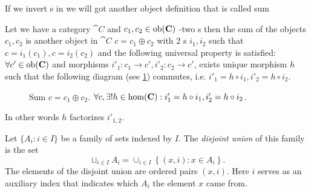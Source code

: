 If we invert s in  we will
got another 
object definition that is called sum

\begin{definition}[Sum]
\label{def:sum}
Let we have a category $\cat{C}$ and $c_1, c_2 \in \mathrm{ob}(\mathbf{C})$ -two
s then the sum of the objects $c_1, c_2$ is
another object in $\cat{C}$ $c = c_1 \oplus c_2$ with 2
s $i_1, i_2$ such that $c = i_1(c_1), c = i_2
(c_2)$ and the 
following universal property is satisfied: $\forall c' \in \mathrm{ob}(\mathbf{C})$
and morphisms $i'_1: c_1 \to c', i'_2: c_2 \to c'$, exists unique
morphism $h$ such that the following diagram (see \cref{fig:sum})
commutes, i.e. $i'_1 = h \circ i_1, i'_2 = h \circ i_2$.
\begin{figure}
  \centering
  \caption{Sum $c = c_1 \oplus c_2$. $\forall c, \exists! h \in
    \mathrm{hom}(\mathbf{C}): i'_1 = h \circ i_1, i'_2 = h \circ i_2 $.}
  \label{fig:sum}
\end{figure}
In other words $h$ factorizes $i'_{1,2}$.
\end{definition}

\begin{definition}
  \label{def:disjoint_union}
  Let $\{A_i: i \in I\}$ be a family of sets 
  indexed by $I$. The 
  \textit{disjoint union} \cite{wiki:disjointunion} of this family is
  the set 
  \[
  \sqcup_{i \in I} A_i = \cup_{i \in I}\left\{
  \left(x, i\right): x \in A_i
  \right\}.
  \]
  The elements of the disjoint union are ordered pairs $(x, i)$. Here $i$
  serves as an auxiliary index that indicates which $A_i$ the element $x$
  came from.
\end{definition}

